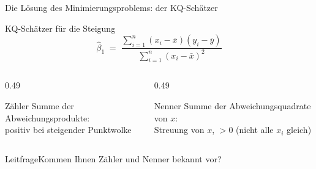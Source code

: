 \documentclass[aspectratio=169,11pt]{beamer}
\newcommand{\leitfrage}[1]{\begin{exampleblock}{Leitfrage}#1\end{exampleblock}}
\begin{document}
\begin{frame}{Die Lösung des Minimierungsproblems: der KQ-Schätzer}
  \begin{block}{KQ-Schätzer für die Steigung}
    \[
      \hat{\beta}_1
      \;=\;
      \frac{\sum_{i=1}^{n} (x_i - \bar{x})(y_i - \bar{y})}
           {\sum_{i=1}^{n} (x_i - \bar{x})^{2}}
    \]
  \end{block}

  \medskip

  \begin{columns}[T]
    \begin{column}{0.49\textwidth}
      \begin{block}{Zähler}
        Summe der Abweichungsprodukte:\\ positiv bei steigender Punktwolke
      \end{block}
    \end{column}
    \begin{column}{0.49\textwidth}
      \begin{block}{Nenner}
        Summe der Abweichungsquadrate von $x$:\\ Streuung von $x$, $> 0$ (nicht alle $x_i$ gleich)
      \end{block}
    \end{column}
  \end{columns}

  \medskip

  \leitfrage{Kommen Ihnen Zähler und Nenner bekannt vor?}
\end{frame}
\end{document}
